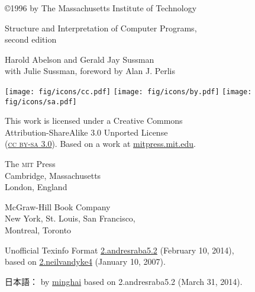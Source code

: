 \documentclass[oneside]{book}
\newcommand{\acronym}[1]{\textsc{\MakeLowercase{#1}}}
\begin{document}



\frontmatter



\pagebreak

\vspace*{\fill}
\thispagestyle{empty}

\begin{small}

\noindent
{\copyright}1996 by The Massachusetts Institute of Technology

\vspace{1.26em}
\noindent
Structure and Interpretation of Computer Programs,\\
second edition

\vspace{1.26em}
\noindent
Harold Abelson and Gerald Jay Sussman\\
with Julie Sussman, foreword by Alan J. Perlis

\vspace{1.6em}
\noindent
\texttt{[image: fig/icons/cc.pdf]}
\texttt{[image: fig/icons/by.pdf]}
\texttt{[image: fig/icons/sa.pdf]}

\vspace{0.4em}
\noindent
This work is licensed under a Creative Commons\\ 
Attribution-ShareAlike 3.0 Unported License\\
(\href{http://creativecommons.org/licenses/by-sa/3.0/}{\acronym{CC BY-SA} 3.0}).
Based on a work at \href{http://mitpress.mit.edu/sicp/}{mitpress.mit.edu}.

\vspace{1.26em}
\noindent
The \acronym{MIT} Press\\
Cambridge, Massachusetts\\ 
London, England

\vspace{1.26em}
\noindent
McGraw-Hill Book Company\\
New York, St. Louis, San Francisco,\\ 
Montreal, Toronto

\vspace{1.26em}
\noindent
Unofficial Texinfo Format \href{http://sicpebook.wordpress.com}{2.andresraba5.2} (February 10, 2014),\\ 
based on \href{http://www.neilvandyke.org/sicp-texi/}{2.neilvandyke4} (January 10, 2007).

\vspace{1.26em}
\noindent
日本語： by \href{http://d.hatena.ne.jp/minghai/}{minghai} based on 2.andresraba5.2 (March 31, 2014).

\end{small}
\end{document}
